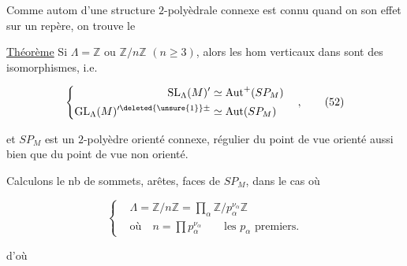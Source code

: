 

Comme  autom d'une structure $2$-polyèdrale  connexe est connu quand on  son effet sur un repère, on trouve le

\noindent\vrule\hspace{.5em}\parbox{.92\linewidth}{\uline{Théorème} Si $\Lambda=\mathbb{Z}$ ou $\mathbb{Z}/n\mathbb{Z}$ $(n\geq3)$, alors les hom verticaux dans  sont des isomorphismes, i.e.}

\[
\left\{\begin{aligned}
\mathrm{SL}_\Lambda(M)'&\simeq\operatorname{Aut}^{+}(SP_M)\\
\mathrm{GL}_\Lambda(M)^{\prime\deleted{\unsure{1}}\pm}&\simeq\operatorname{Aut}(SP_M)
\end{aligned}\right.\quad,\tag*{(52)}
\]

\noindent\vrule\hspace{.5em}\parbox{.92\linewidth}{et $SP_M$ est un $2$-polyèdre  orienté connexe, régulier du point de vue orienté aussi bien que du point de vue non orienté.}

Calculons le nb de sommets, arêtes, faces de $SP_M$, dans le cas où

\[
\left\{\begin{aligned}
&\Lambda=\mathbb{Z}/n\mathbb{Z}=\prod_{\alpha}\mathbb{Z}/p_\alpha^{\nu_\alpha}\mathbb{Z}\\
&\text{où}\quad n=\prod p_\alpha^{\nu_\alpha}\qquad\text{les }p_\alpha\text{ premiers.}
\end{aligned}\right.\tag*{(53)}
\]

d'où

